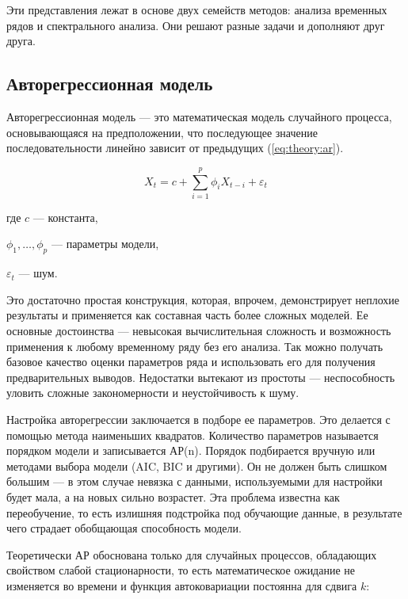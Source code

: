 Эти представления лежат в основе двух семейств методов: анализа временных рядов и спектрального анализа. Они решают разные задачи и дополняют друг друга.


\subsection{Авторегрессионная модель}

Авторегрессионная модель --- это математическая модель случайного процесса, основывающаяся на предположении, что последующее значение последовательности линейно зависит от предыдущих (\autoref{eq:theory:ar}).

\begin{equation}
  \label{eq:theory:ar}
  X_t = c + \sum_{i=1}^p \phi_i X_{t-i} + \varepsilon_t
\end{equation}
\begin{explanation}
\item[где] $c$ --- константа,
\item $\phi_1, \dotsc, \phi_p$ --- параметры модели,
\item $\varepsilon_t$ --- шум.
\end{explanation}

Это достаточно простая конструкция, которая, впрочем, демонстрирует неплохие результаты и применяется как составная часть более сложных моделей.
Ее основные достоинства --- невысокая вычислительная сложность и возможность применения к любому временному ряду без его анализа. Так можно получать базовое качество оценки параметров ряда и использовать его для получения предварительных выводов.
Недостатки вытекают из простоты --- неспособность уловить сложные закономерности и неустойчивость к шуму.


Настройка авторегрессии заключается в подборе ее параметров. Это делается с помощью метода наименьших квадратов. Количество параметров называется порядком модели и записывается АР(n). Порядок подбирается вручную или методами выбора модели (AIC, BIC и другими). Он не должен быть слишком большим --- в этом случае невязка с данными, используемыми для настройки будет мала, а на новых сильно возрастет. Эта проблема известна как переобучение, то есть излишняя подстройка под обучающие данные, в результате чего страдает обобщающая способность модели.

Теоретически АР обоснована только для случайных процессов, обладающих свойством слабой стационарности, то есть математическое ожидание не изменяется во времени и функция автоковариации постоянна для сдвига $k$:

